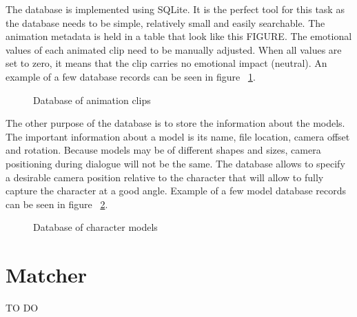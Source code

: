 The database is implemented using SQLite. It is the perfect tool for this task as the database needs to be simple, relatively small and easily searchable. The animation metadata is held in a table that look like this FIGURE. The emotional values of each animated clip need to be manually adjusted. When all values are set to zero, it means that the clip carries no emotional impact (neutral). An example of a few database records can be seen in figure ~\ref{fig:db}.

\begin{figure}[!ht]
\centerline{}
\caption{Database of animation clips}\label{fig:db}
\end{figure}

The other purpose of the database is to store the information about the models. The important information about a model is its name, file location, camera offset and rotation. Because models may be of different shapes and sizes, camera positioning during dialogue will not be the same. The database allows to specify a desirable camera position relative to the character that will allow to fully capture the character at a good angle. Example of a few model database records can be seen in figure ~\ref{fig:dbmodel}.

\begin{figure}[!ht]
\centerline{}
\caption{Database of character models}\label{fig:dbmodel}
\end{figure}


\section{Matcher}

TO DO


